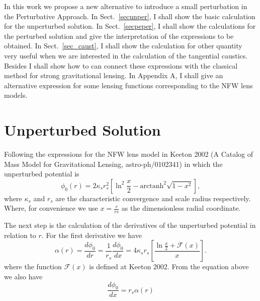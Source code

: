 \documentclass[a4paper,twoside]{article}
\def \ks {\kappa_s}
\def \rs {r_s}
\def \mf {\mathcal{F}}
\def \atanh {\mathrm{arctanh} }
\def \po {\phi_0}
\def \al {\alpha}
\begin{document}
In this work we propose a new alternative to introduce a small perturbation in the Perturbative Approach. In Sect.~\ref{secunper}, I shall show the basic calculation for the unperturbed solution. In Sect.~\ref{secpeper}, I shall show the calculations for the perturbed solution and give the interpretation of the expressions to be obtained. In Sect.~\ref{sec_caust}, I shall show the calculation for other quantity very useful when we are interested in the calculation of the tangential caustics. Besides I shall show how to can connect these expressions with the classical method for strong gravitational lensing. In Appendix A, I shall give an alternative expression for some lensing functions corresponding to the NFW lens models.

\section{\label{secunper}Unperturbed Solution}

Following the expressions for the NFW lens model in Keeton 2002 (A Catalog of Mass Model for Gravitational Lensing, astro-ph/0102341) in which 
the unperturbed potential is
\begin{equation}
\po(r)=2\ks \rs^2\left[\ln^2\dfrac{x}{2}-\atanh^2\sqrt{1-x^2}\right],
\label{nfwpot}
\end{equation}
where $\ks$ and $\rs$ are the characteristic convergence and scale radius respectively. Where, for convenience we use $x=\frac{r}{rs}$ as  the dimensionless radial coordinate.

The next step is the calculation of the derivatives of the unperturbed potential in relation to $r$. For the first 
derivative we have
\begin{equation}
\al(r)=\dfrac{d\po}{dr}=\frac{1}{\rs}\frac{d\po}{dx}=4\ks\rs\left[\dfrac{\ln\frac{x}{2}+\mf(x)}{x}\right].
\label{nfwfd}
\end{equation}
where the function $\mf(x)$ is defined at Keeton 2002. From the equation above we also have
\begin{equation}
\dfrac{d\po}{dx}=\rs\al(r)
\label{rda}
\end{equation}
\end{document}
